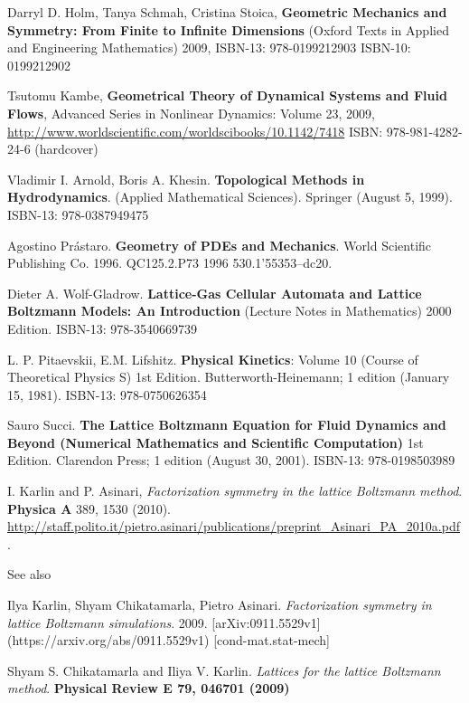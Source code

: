 \documentclass[twoside,landscape,10pt]{amsart}
\theoremstyle{plain}
\theoremstyle{definition}
\theoremstyle{remark}
\theoremstyle{remark}
\begin{document}
\begin{thebibliography}{9}
Darryl D. Holm, Tanya Schmah, Cristina Stoica, \textbf{Geometric Mechanics and Symmetry: From Finite to Infinite Dimensions} (Oxford Texts in Applied and Engineering Mathematics) 2009,  ISBN-13: 978-0199212903  ISBN-10: 0199212902  

Tsutomu Kambe, \textbf{Geometrical Theory of Dynamical Systems and Fluid Flows}, Advanced Series in Nonlinear Dynamics: Volume 23, 2009, \url{http://www.worldscientific.com/worldscibooks/10.1142/7418} ISBN: 978-981-4282-24-6 (hardcover)

Vladimir I. Arnold, Boris A. Khesin.  \textbf{Topological Methods in Hydrodynamics}. (Applied Mathematical Sciences).  Springer (August 5, 1999).  ISBN-13: 978-0387949475

Agostino Pr\'{a}staro.  \textbf{Geometry of PDEs and Mechanics}.  World Scientific Publishing Co.  1996.  QC125.2.P73 1996  530.1'55353--dc20.  

Dieter A. Wolf-Gladrow.  \textbf{Lattice-Gas Cellular Automata and Lattice Boltzmann Models: An Introduction} (Lecture Notes in Mathematics) 2000 Edition.  ISBN-13: 978-3540669739


L. P. Pitaevskii, E.M. Lifshitz. \textbf{Physical Kinetics}: Volume 10 (Course of Theoretical Physics S) 1st Edition.  Butterworth-Heinemann; 1 edition (January 15, 1981).  ISBN-13: 978-0750626354

 Sauro Succi.  \textbf{The Lattice Boltzmann Equation for Fluid Dynamics and Beyond (Numerical Mathematics and Scientific Computation)} 1st Edition.  Clarendon Press; 1 edition (August 30, 2001).  ISBN-13: 978-0198503989



I. Karlin and P. Asinari, \emph{Factorization symmetry in the lattice Boltzmann method}.  \textbf{Physica A} 389, 1530 (2010).  \url{http://staff.polito.it/pietro.asinari/publications/preprint_Asinari_PA_2010a.pdf}.  

See also

Ilya Karlin, Shyam Chikatamarla, Pietro Asinari. \emph{Factorization symmetry in lattice Boltzmann simulations}.  2009.  [arXiv:0911.5529v1](https://arxiv.org/abs/0911.5529v1) [cond-mat.stat-mech] 

Shyam S. Chikatamarla and Iliya V. Karlin.  \emph{Lattices for the lattice Boltzmann method}.  \textbf{Physical Review E 79, 046701 (2009)}  
  

\end{thebibliography}
\end{document}
